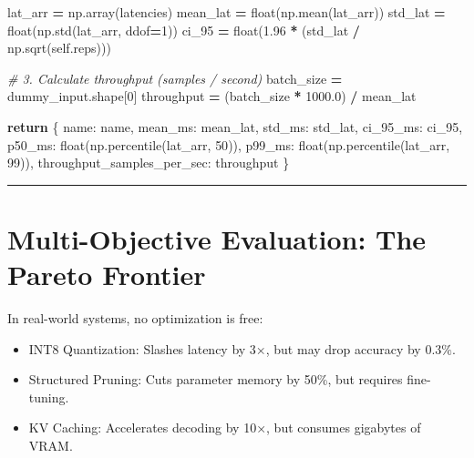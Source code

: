 \documentclass[
  letterpaper,
]{scrbook}
\newenvironment{Shaded}{\begin{snugshade}}{\end{snugshade}}
\newcommand{\BuiltInTok}[1]{#1}
\newcommand{\CommentTok}[1]{\textcolor[rgb]{0.56,0.35,0.01}{\textit{#1}}}
\newcommand{\ControlFlowTok}[1]{\textcolor[rgb]{0.13,0.29,0.53}{\textbf{#1}}}
\newcommand{\DecValTok}[1]{\textcolor[rgb]{0.00,0.00,0.81}{#1}}
\newcommand{\FloatTok}[1]{\textcolor[rgb]{0.00,0.00,0.81}{#1}}
\newcommand{\NormalTok}[1]{#1}
\newcommand{\OperatorTok}[1]{\textcolor[rgb]{0.81,0.36,0.00}{\textbf{#1}}}
\newcommand{\StringTok}[1]{\textcolor[rgb]{0.31,0.60,0.02}{#1}}
\newcommand{\VariableTok}[1]{\textcolor[rgb]{0.00,0.00,0.00}{#1}}
\providecommand{\tightlist}{%
  \setlength{\itemsep}{0pt}\setlength{\parskip}{0pt}}
\begin{document}
\begin{Shaded}
\begin{Highlighting}[]
\NormalTok{        lat\_arr }\OperatorTok{=}\NormalTok{ np.array(latencies)}
\NormalTok{        mean\_lat }\OperatorTok{=} \BuiltInTok{float}\NormalTok{(np.mean(lat\_arr))}
\NormalTok{        std\_lat }\OperatorTok{=} \BuiltInTok{float}\NormalTok{(np.std(lat\_arr, ddof}\OperatorTok{=}\DecValTok{1}\NormalTok{))}
\NormalTok{        ci\_95 }\OperatorTok{=} \BuiltInTok{float}\NormalTok{(}\FloatTok{1.96} \OperatorTok{*}\NormalTok{ (std\_lat }\OperatorTok{/}\NormalTok{ np.sqrt(}\VariableTok{self}\NormalTok{.reps)))}

        \CommentTok{\# 3. Calculate throughput (samples / second)}
\NormalTok{        batch\_size }\OperatorTok{=}\NormalTok{ dummy\_input.shape[}\DecValTok{0}\NormalTok{]}
\NormalTok{        throughput }\OperatorTok{=}\NormalTok{ (batch\_size }\OperatorTok{*} \FloatTok{1000.0}\NormalTok{) }\OperatorTok{/}\NormalTok{ mean\_lat}

        \ControlFlowTok{return}\NormalTok{ \{}
            \StringTok{\textquotesingle{}name\textquotesingle{}}\NormalTok{: name,}
            \StringTok{\textquotesingle{}mean\_ms\textquotesingle{}}\NormalTok{: mean\_lat,}
            \StringTok{\textquotesingle{}std\_ms\textquotesingle{}}\NormalTok{: std\_lat,}
            \StringTok{\textquotesingle{}ci\_95\_ms\textquotesingle{}}\NormalTok{: ci\_95,}
            \StringTok{\textquotesingle{}p50\_ms\textquotesingle{}}\NormalTok{: }\BuiltInTok{float}\NormalTok{(np.percentile(lat\_arr, }\DecValTok{50}\NormalTok{)),}
            \StringTok{\textquotesingle{}p99\_ms\textquotesingle{}}\NormalTok{: }\BuiltInTok{float}\NormalTok{(np.percentile(lat\_arr, }\DecValTok{99}\NormalTok{)),}
            \StringTok{\textquotesingle{}throughput\_samples\_per\_sec\textquotesingle{}}\NormalTok{: throughput}
\NormalTok{        \}}
\end{Highlighting}
\end{Shaded}

\begin{center}\rule{0.5\linewidth}{0.5pt}\end{center}

\section{Multi-Objective Evaluation: The Pareto
Frontier}\label{multi-objective-evaluation-the-pareto-frontier}

In real-world systems, no optimization is free:

\begin{itemize}
\tightlist
\item
  INT8 Quantization: Slashes latency by 3×, but may drop accuracy by
  \(0.3\%\).
\item
  Structured Pruning: Cuts parameter memory by 50\%, but requires
  fine-tuning.
\item
  KV Caching: Accelerates decoding by 10×, but consumes gigabytes of
  VRAM.
\end{itemize}
\end{document}
